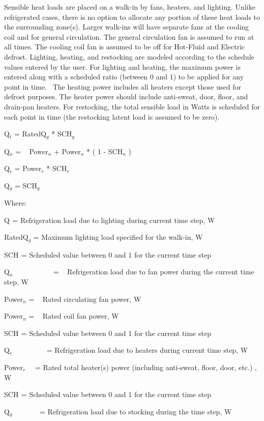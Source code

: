 Sensible heat loads are placed on a walk-in by fans, heaters, and lighting. Unlike refrigerated cases, there is no option to allocate any portion of these heat loads to the surrounding zone(s). Larger walk-ins will have separate fans at the cooling coil and for general circulation. The general circulation fan is assumed to run at all times. The cooling coil fan is assumed to be off for Hot-Fluid and Electric defrost. Lighting, heating, and restocking are modeled according to the schedule values entered by the user. For lighting and heating, the maximum power is entered along with a scheduled ratio (between 0 and 1) to be applied for any point in time.~ The heating power includes all heaters except those used for defrost purposes. The heater power should include anti-sweat, door, floor, and drain-pan heaters. For restocking, the total sensible load in Watts is scheduled for each point in time (the restocking latent load is assumed to be zero).

Q\(_{t}\) = RatedQ\(_{g}\) * SCH\(_{g}\)

Q\(_{n}\) = ~ Power\(_{n}\) + Power\(_{n}\) * ( 1 - SCH\(_{n}\) )

Q\(_{r}\) = Power\(_{r}\) * SCH\(_{r}\)

Q\(_{g}\) = SCH\(_{g}\)

Where:

Q\(_{ }\) = Refrigeration load due to lighting during current time step, W

RatedQ\(_{g}\) = Maximum lighting load specified for the walk-in, W

SCH\(_{ }\) = Scheduled value between 0 and 1 for the current time step

Q\(_{n}\) ~~~~~~~~~~ = ~ Refrigeration load due to fan power during the current time step, W

Power\(_{n}\) = ~ Rated circulating fan power, W

Power\(_{n}\) = ~ Rated coil fan power, W

SCH\(_{ }\) = Scheduled value between 0 and 1 for the current time step

Q\(_{r}\)~~~~~~~~~ = Refrigeration load due to heaters during current time step, W

Power\(_{r}\)~~ = Rated total heater(s) power (including anti-sweat, floor, door, etc.) , W

SCH\(_{ }\) = Scheduled value between 0 and 1 for the current time step

Q\(_{g}\)~~~~~~~ = Refrigeration load due to stocking during the time step, W

